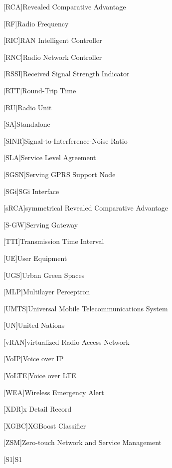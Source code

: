 \begin{acronym}[]
[RCA]{Revealed Comparative Advantage}

[RF]{Radio Frequency}

[RIC]{RAN Intelligent Controller}

[RNC]{Radio Network Controller}  

[RSSI]{Received Signal Strength Indicator}

[RTT]{Round-Trip Time}

[RU]{Radio Unit}  

[SA]{Standalone}

[SINR]{Signal-to-Interference-Noise Ratio}  

[SLA]{Service Level Agreement}

[SGSN]{Serving GPRS Support Node}  

[SGi]{SGi Interface}  



[sRCA]{symmetrical Revealed Comparative Advantage}

[S-GW]{Serving Gateway}  


[TTI]{Transmission Time Interval}

[UE]{User Equipment}

[UGS]{Urban Green Spaces}

[MLP]{Multilayer Perceptron}



[UMTS]{Universal Mobile Telecommunications System}  

[UN]{United Nations}


[vRAN]{virtualized Radio Access Network}

[VoIP]{Voice over IP}

[VoLTE]{Voice over LTE}

[WEA]{Wireless Emergency Alert}

[XDR]{x Detail Record}

[XGBC]{XGBoost Classifier}

[ZSM]{Zero-touch Network and Service Management}

[S1]{S1}

\end{acronym}

